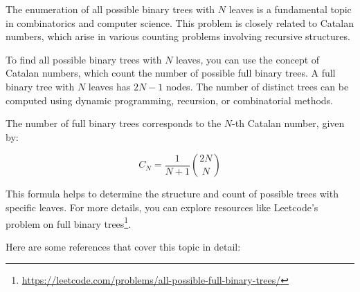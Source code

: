 \documentclass{article}
\begin{document}
The enumeration of all possible binary trees with $N$ leaves is a fundamental topic in combinatorics and computer science. This problem is closely related to Catalan numbers, which arise in various counting problems involving recursive structures.

To find all possible binary trees with $N$ leaves, you can use the concept of Catalan numbers, which count the number of possible full binary trees. A full binary tree with $N$ leaves has $2N-1$ nodes. The number of distinct trees can be computed using dynamic programming, recursion, or combinatorial methods.

The number of full binary trees corresponds to the $N$-th Catalan number, given by:

\[
C_N = \frac{1}{N+1} \binom{2N}{N}
\]

This formula helps to determine the structure and count of possible trees with specific leaves. For more details, you can explore resources like Leetcode's problem on full binary trees\footnote{\url{https://leetcode.com/problems/all-possible-full-binary-trees/}}.

Here are some references that cover this topic in detail:
\end{document}
